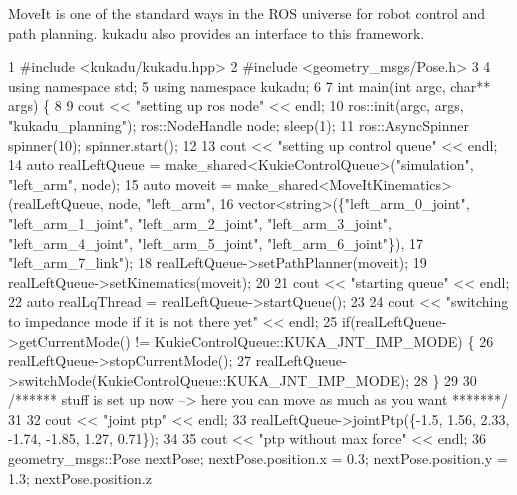 Move\-It is one of the standard ways in the R\-O\-S universe for robot control and path planning. kukadu also provides an interface to this framework.


\begin{DoxyCodeInclude}
1 \textcolor{preprocessor}{#include <kukadu/kukadu.hpp>}
2 \textcolor{preprocessor}{#include <geometry\_msgs/Pose.h>}
3 
4 \textcolor{keyword}{using namespace }std;
5 \textcolor{keyword}{using namespace }kukadu;
6 
7 \textcolor{keywordtype}{int} main(\textcolor{keywordtype}{int} argc, \textcolor{keywordtype}{char}** args) \{
8 
9     cout << \textcolor{stringliteral}{"setting up ros node"} << endl;
10     ros::init(argc, args, \textcolor{stringliteral}{"kukadu\_planning"}); ros::NodeHandle node; sleep(1);
11     ros::AsyncSpinner spinner(10); spinner.start();
12 
13     cout << \textcolor{stringliteral}{"setting up control queue"} << endl;
14     \textcolor{keyword}{auto} realLeftQueue = make\_shared<KukieControlQueue>(\textcolor{stringliteral}{"simulation"}, \textcolor{stringliteral}{"left\_arm"}, node);
15     \textcolor{keyword}{auto} moveit = make\_shared<MoveItKinematics>(realLeftQueue, node, \textcolor{stringliteral}{"left\_arm"},
16             vector<string>(\{\textcolor{stringliteral}{"left\_arm\_0\_joint"}, \textcolor{stringliteral}{"left\_arm\_1\_joint"}, \textcolor{stringliteral}{"left\_arm\_2\_joint"}, \textcolor{stringliteral}{"left\_arm\_3\_joint"},
       \textcolor{stringliteral}{"left\_arm\_4\_joint"}, \textcolor{stringliteral}{"left\_arm\_5\_joint"}, \textcolor{stringliteral}{"left\_arm\_6\_joint"}\}),
17             \textcolor{stringliteral}{"left\_arm\_7\_link"});
18     realLeftQueue->setPathPlanner(moveit);
19     realLeftQueue->setKinematics(moveit);
20 
21     cout << \textcolor{stringliteral}{"starting queue"} << endl;
22     \textcolor{keyword}{auto} realLqThread = realLeftQueue->startQueue();
23 
24     cout << \textcolor{stringliteral}{"switching to impedance mode if it is not there yet"} << endl;
25     \textcolor{keywordflow}{if}(realLeftQueue->getCurrentMode() != KukieControlQueue::KUKA\_JNT\_IMP\_MODE) \{
26         realLeftQueue->stopCurrentMode();
27         realLeftQueue->switchMode(KukieControlQueue::KUKA\_JNT\_IMP\_MODE);
28     \}
29 
30     \textcolor{comment}{/****** stuff is set up now --> here you can move as much as you want *******/}
31 
32     cout << \textcolor{stringliteral}{"joint ptp"} << endl;
33     realLeftQueue->jointPtp(\{-1.5, 1.56, 2.33, -1.74, -1.85, 1.27, 0.71\});
34 
35     cout << \textcolor{stringliteral}{"ptp without max force"} << endl;
36     geometry\_msgs::Pose nextPose; nextPose.position.x = 0.3; nextPose.position.y = 1.3; nextPose.position.z

\end{DoxyCodeInclude}

